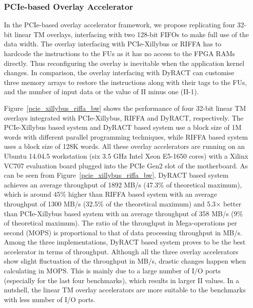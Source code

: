 \subsubsection{PCIe-based Overlay Accelerator}
In the PCIe-based overlay accelerator framework, we propose replicating four 32-bit linear TM overlays, interfacing with two 128-bit FIFOs to make full use of the data width.
The overlay interfacing with PCIe-Xillybus or RIFFA has to hardcode the instructions to the FUs as it has no access to the FPGA RAMs directly. 
Thus reconfiguring the overlay is inevitable when the application kernel changes. 
In comparison, the overlay interfacing with DyRACT can customise three memory arrays to restore the instructions along with their tags to the FUs, and the number of input data or the value of II minus one (II-1). 


Figure~\ref{pcie_xillybus_riffa_bw} shows the performance of four 32-bit linear TM overlays integrated with PCIe-Xillybus, RIFFA and DyRACT, respectively. 
The PCIe-Xillybus based system and DyRACT based system use a block size of 1M words with different parallel programming techniques, while RIFFA based system uses a block size of 128K words.
All these overlay accelerators are running on an Ubuntu 14.04.5 workstation (six 3.5 GHz Intel Xeon E5-1650 cores) with a Xilinx VC707 evaluation board plugged into the PCIe Gen2 slot of the motherboard. 
As can be seen from Figure~\ref{pcie_xillybus_riffa_bw}, DyRACT based system achieves an average throughput of 1892 MB/s (47.3\% of theoretical maximum), which is around 45\% higher than RIFFA based system with an average throughput of 1300 MB/s (32.5\% of the theoretical maximum) and 5.3$\times$ better than PCIe-Xillybus based system with an average throughput of 358 MB/s (9\% of theoretical maximum). 
The ratio of the throughput in Mega-operations per second (MOPS) is proportional to that of data processing throughput in MB/s. 
Among the three implementations, DyRACT based system proves to be the best accelerator in terms of throughput. 
Although all the three overlay accelerators show slight fluctuation of the throughput in MB/s, drastic changes happen when calculating in MOPS. 
This is mainly due to a large number of I/O ports (especially for the last four benchmarks), which results in larger II values. 
In a nutshell, the linear TM overlay accelerators are more suitable to the benchmarks with less number of I/O ports. 



